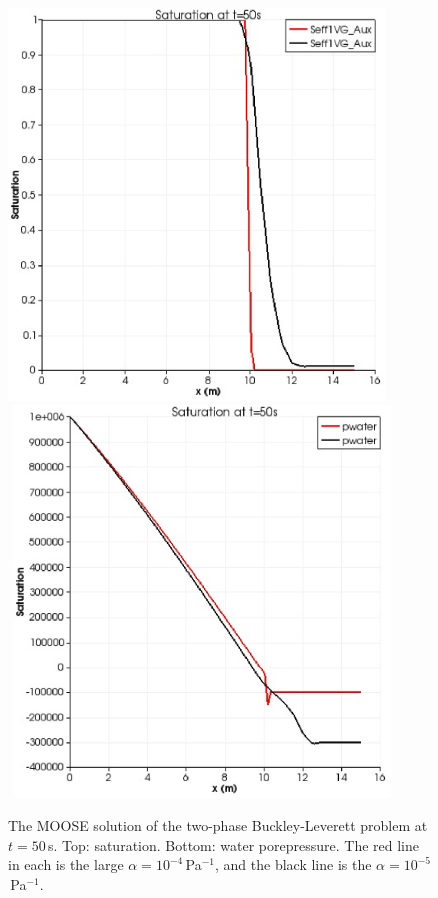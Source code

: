 \documentclass[]{scrreprt}
\begin{document}
\begin{figure}[htb]
\begin{center}
\includegraphics[width=10cm]{bl2_seff.eps} \\
$\mbox{}$
\includegraphics[width=10cm]{bl2_p.eps} \\
\caption{The MOOSE solution of the two-phase Buckley-Leverett problem at
  $t=50$\,s.  Top: saturation.  Bottom: water porepressure.  The red line in
  each is the large $\alpha=10^{-4}$\,Pa$^{-1}$, and the black line is
  the $\alpha=10^{-5}$\,Pa$^{-1}$.}
\label{satfront2.figa}
\end{center}
\end{figure}
\end{document}
